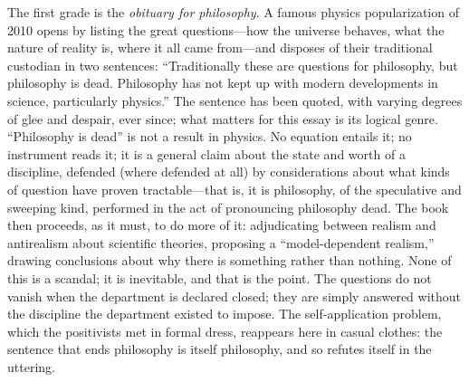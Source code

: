 The first grade is the \emph{obituary for philosophy}. A famous physics popularization of 2010 opens by listing the great questions---how the universe behaves, what the nature of reality is, where it all came from---and disposes of their traditional custodian in two sentences: ``Traditionally these are questions for philosophy, but philosophy is dead. Philosophy has not kept up with modern developments in science, particularly physics.'' The sentence has been quoted, with varying degrees of glee and despair, ever since; what matters for this essay is its logical genre. ``Philosophy is dead'' is not a result in physics. No equation entails it; no instrument reads it; it is a general claim about the state and worth of a discipline, defended (where defended at all) by considerations about what kinds of question have proven tractable---that is, it is philosophy, of the speculative and sweeping kind, performed in the act of pronouncing philosophy dead. The book then proceeds, as it must, to do more of it: adjudicating between realism and antirealism about scientific theories, proposing a ``model-dependent realism,'' drawing conclusions about why there is something rather than nothing. None of this is a scandal; it is inevitable, and that is the point. The questions do not vanish when the department is declared closed; they are simply answered without the discipline the department existed to impose. The self-application problem, which the positivists met in formal dress, reappears here in casual clothes: the sentence that ends philosophy is itself philosophy, and so refutes itself in the uttering.

